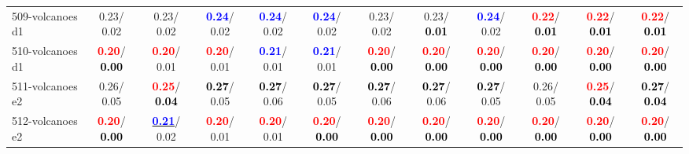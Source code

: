 \begin{table}[h]
\begin{center}
{\begin{tabular}{lc|c|c|c|c|c|c|c|c|c|c}
509-volcanoes d1 &   0.23/  0.02 &   0.23/  0.02 & \textcolor{blue}{\textbf{  0.24}}/  0.02 & \textcolor{blue}{\textbf{  0.24}}/  0.02 & \textcolor{blue}{\textbf{  0.24}}/  0.02 &   0.23/  0.02 &   0.23/\textcolor{black}{\textbf{  0.01}} & \textcolor{blue}{\textbf{  0.24}}/  0.02 & \textcolor{red}{\textbf{  0.22}}/\textcolor{black}{\textbf{  0.01}} & \textcolor{red}{\textbf{  0.22}}/\textcolor{black}{\textbf{  0.01}} & \textcolor{red}{\textbf{  0.22}}/\textcolor{black}{\textbf{  0.01}} \\
510-volcanoes d1 & \textcolor{red}{\textbf{  0.20}}/\textcolor{black}{\textbf{  0.00}} & \textcolor{red}{\textbf{  0.20}}/  0.01 & \textcolor{red}{\textbf{  0.20}}/  0.01 & \textcolor{blue}{\textbf{  0.21}}/  0.01 & \textcolor{blue}{\textbf{  0.21}}/  0.01 & \textcolor{red}{\textbf{  0.20}}/\textcolor{black}{\textbf{  0.00}} & \textcolor{red}{\textbf{  0.20}}/\textcolor{black}{\textbf{  0.00}} & \textcolor{red}{\textbf{  0.20}}/\textcolor{black}{\textbf{  0.00}} & \textcolor{red}{\textbf{  0.20}}/\textcolor{black}{\textbf{  0.00}} & \textcolor{red}{\textbf{  0.20}}/\textcolor{black}{\textbf{  0.00}} & \textcolor{red}{\textbf{  0.20}}/\textcolor{black}{\textbf{  0.00}} \\
511-volcanoes e2 &   0.26/  0.05 & \textcolor{red}{\textbf{  0.25}}/\textcolor{black}{\textbf{  0.04}} & \textcolor{black}{\textbf{  0.27}}/  0.05 & \textcolor{black}{\textbf{  0.27}}/  0.06 & \textcolor{black}{\textbf{  0.27}}/  0.05 & \textcolor{black}{\textbf{  0.27}}/  0.06 & \textcolor{black}{\textbf{  0.27}}/  0.06 & \textcolor{black}{\textbf{  0.27}}/  0.05 &   0.26/  0.05 & \textcolor{red}{\textbf{  0.25}}/\textcolor{black}{\textbf{  0.04}} & \textcolor{black}{\textbf{  0.27}}/\textcolor{black}{\textbf{  0.04}} \\
512-volcanoes e2 & \textcolor{red}{\textbf{  0.20}}/\textcolor{black}{\textbf{  0.00}} & \underline{\textcolor{blue}{\textbf{  0.21}}}/  0.02 & \textcolor{red}{\textbf{  0.20}}/  0.01 & \textcolor{red}{\textbf{  0.20}}/  0.01 & \textcolor{red}{\textbf{  0.20}}/\textcolor{black}{\textbf{  0.00}} & \textcolor{red}{\textbf{  0.20}}/\textcolor{black}{\textbf{  0.00}} & \textcolor{red}{\textbf{  0.20}}/\textcolor{black}{\textbf{  0.00}} & \textcolor{red}{\textbf{  0.20}}/\textcolor{black}{\textbf{  0.00}} & \textcolor{red}{\textbf{  0.20}}/\textcolor{black}{\textbf{  0.00}} & \textcolor{red}{\textbf{  0.20}}/\textcolor{black}{\textbf{  0.00}} & \textcolor{red}{\textbf{  0.20}}/\textcolor{black}{\textbf{  0.00}} \\\end{tabular}}\label{stratsALCKappa15Allalla}
\end{center}
\end{table}
